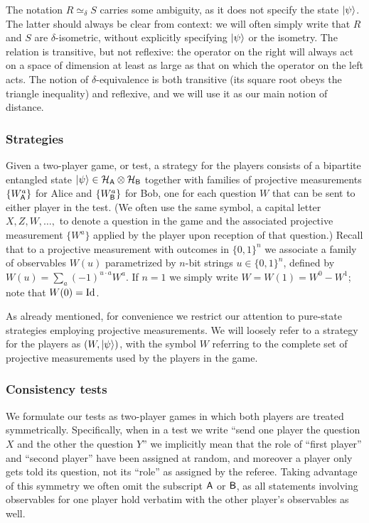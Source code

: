 The notation $R\simeq_\delta S$ carries some ambiguity, as it does not specify the state $|\psi\rangle$. The latter should always be clear from context: we will often simply write that $R$ and $S$ are $\delta$-isometric, without explicitly specifying $|\psi\rangle$ or the isometry. The relation is transitive, but not reflexive: the operator on the right will always act on a space of dimension at least as large as that on which the operator on the left acts. The notion of $\delta$-equivalence is both transitive (its square root obeys the triangle inequality) and reflexive, and we will use it as our main notion of distance. 

\subsubsection{Strategies}

Given a two-player game, or test, a strategy for the players consists of a bipartite entangled state $|\psi\rangle \in \mathcal{H}_{\textsf{A}} \otimes \mathcal{H}_{\textsf{B}}$ together with families of projective  measurements $\{W^a_{\textsf{A}}\}$ for Alice and $\{W_{\textsf{B}}^a\}$ for Bob, one for each question $W$ that can be sent to either player in the test. (We often use the same symbol, a capital letter $X,Z,W,\ldots,$ to denote a question in the game and the associated projective measurement $\{W^a\}$ applied by the player upon reception of that question.) 
 Recall that to a projective measurement with outcomes in $\{0,1\}^n$ we  associate a family of observables $W(u)$ parametrized by $n$-bit strings $u\in\{0,1\}^n$, defined by $W(u) = \sum_a (-1)^{u\cdot a} W^a$. If $n=1$ we simply write $W=W(1)=W^0-W^1$; note that $W(0)=\mathop{\rm Id}\nolimits$.

As already mentioned, for convenience we restrict our attention to pure-state strategies employing projective measurements. 
We will loosely refer to a strategy for the players as $(W,|\psi\rangle)$, with the symbol $W$ referring to the complete set of projective measurements used by the players in the game.

\subsubsection{Consistency tests}

We formulate our tests as two-player games in which both players are treated symmetrically. Specifically, when in a test we write ``send one player the question $X$ and the other the question $Y$'' we implicitly mean that the role of ``first player'' and ``second player'' have been assigned at random, and moreover a player only gets told its question, not its ``role'' as assigned by the referee. 
 Taking advantage of this symmetry we often omit the subscript ${\textsf{A}}$ or ${\textsf{B}}$, as all statements involving observables for one player hold verbatim with the other player's observables as well. 

